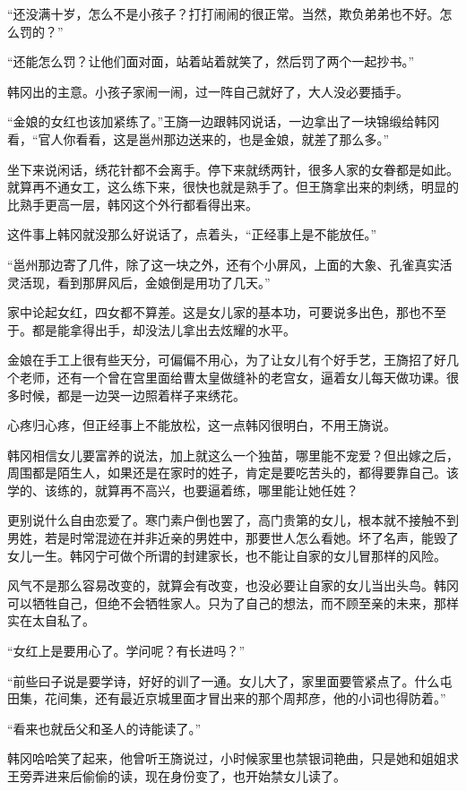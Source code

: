 “还没满十岁，怎么不是小孩子？打打闹闹的很正常。当然，欺负弟弟也不好。怎么罚的？”

“还能怎么罚？让他们面对面，站着站着就笑了，然后罚了两个一起抄书。”

韩冈出的主意。小孩子家闹一闹，过一阵自己就好了，大人没必要插手。

“金娘的女红也该加紧练了。”王旖一边跟韩冈说话，一边拿出了一块锦缎给韩冈看，“官人你看看，这是邕州那边送来的，也是金娘，就差了那么多。”

坐下来说闲话，绣花针都不会离手。停下来就绣两针，很多人家的女眷都是如此。就算再不通女工，这么练下来，很快也就是熟手了。但王旖拿出来的刺绣，明显的比熟手更高一层，韩冈这个外行都看得出来。

这件事上韩冈就没那么好说话了，点着头，“正经事上是不能放任。”

“邕州那边寄了几件，除了这一块之外，还有个小屏风，上面的大象、孔雀真实活灵活现，看到那屏风后，金娘倒是用功了几天。”

家中论起女红，四女都不算差。这是女儿家的基本功，可要说多出色，那也不至于。都是能拿得出手，却没法儿拿出去炫耀的水平。

金娘在手工上很有些天分，可偏偏不用心，为了让女儿有个好手艺，王旖招了好几个老师，还有一个曾在宫里面给曹太皇做缝补的老宫女，逼着女儿每天做功课。很多时候，都是一边哭一边照着样子来绣花。

心疼归心疼，但正经事上不能放松，这一点韩冈很明白，不用王旖说。

韩冈相信女儿要富养的说法，加上就这么一个独苗，哪里能不宠爱？但出嫁之后，周围都是陌生人，如果还是在家时的姓子，肯定是要吃苦头的，都得要靠自己。该学的、该练的，就算再不高兴，也要逼着练，哪里能让她任姓？

更别说什么自由恋爱了。寒门素户倒也罢了，高门贵第的女儿，根本就不接触不到男姓，若是时常混迹在并非近亲的男姓中，那要世人怎么看她。坏了名声，能毁了女儿一生。韩冈宁可做个所谓的封建家长，也不能让自家的女儿冒那样的风险。

风气不是那么容易改变的，就算会有改变，也没必要让自家的女儿当出头鸟。韩冈可以牺牲自己，但绝不会牺牲家人。只为了自己的想法，而不顾至亲的未来，那样实在太自私了。

“女红上是要用心了。学问呢？有长进吗？”

“前些曰子说是要学诗，好好的训了一通。女儿大了，家里面要管紧点了。什么屯田集，花间集，还有最近京城里面才冒出来的那个周邦彦，他的小词也得防着。”

“看来也就岳父和圣人的诗能读了。”

韩冈哈哈笑了起来，他曾听王旖说过，小时候家里也禁银词艳曲，只是她和姐姐求王旁弄进来后偷偷的读，现在身份变了，也开始禁女儿读了。

